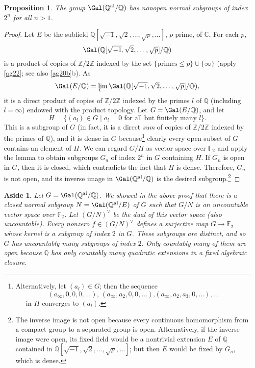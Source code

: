 \documentclass[a4paper,11pt,final,openany]{memoir}
\newtheorem{proposition}[X]{Proposition}
\newtheorem{aside}[X]{Aside}
\theoremstyle{nonumberplain}
\newtheorem{proof}{Proof.}
\begin{document}
\begin{proposition}
\label{ig17}The group $\Gal(\mathbb{Q}^{\mathrm{al}}/\mathbb{Q}{})$ has
nonopen normal subgroups of index $2^{n}$ for all $n>1$.
\end{proposition}

\begin{proof}
Let $E$ be the subfield $\mathbb{Q}{}[\sqrt{-1},\sqrt{2},\ldots,\sqrt
{p},\ldots]$, $p$ prime, of $\mathbb{C}$. For each $p$,
\[
\Gal(\mathbb{Q}[\sqrt{-1},\sqrt{2},\ldots,\sqrt{p}]/\mathbb{Q})
\]
is a product of copies of $\mathbb{Z}/2\mathbb{Z}$ indexed by the set
$\{\mathrm{primes}\leq p\}\cup\{\infty\}$ (apply \ref{ag22}; see also
\ref{ag20b}b). As
\[
\Gal(E/\mathbb{Q}{})=\varprojlim\Gal(\mathbb{Q}{}[\sqrt{-1},\sqrt{2}%
,\ldots,\sqrt{p}]/\mathbb{Q}{}),
\]
it is a direct product of copies of $\mathbb{Z}/2\mathbb{Z}$ indexed by the
primes $l$ of $\mathbb{Q}{}$ (including $l=\infty$) endowed with the product
topology. Let $G=\Gal(E/\mathbb{Q}{})$, and let
\[
H=\{(a_{l})\in G\mid a_{l}=0\text{ for all but finitely many }l\}.
\]
This is a subgroup of $G$ (in fact, it is a direct \textit{sum} of copies of
$\mathbb{Z}/2\mathbb{Z}$ indexed by the primes of $\mathbb{Q}{}$), and it is
dense in $G$ because\footnote{Alternatively, let $(a_{l})\in G$; then the
sequence
\[
(a_{\infty},0,0,0,\ldots)\text{, }(a_{\infty},a_{2},0,0,\ldots)\text{,
}(a_{\infty},a_{2},a_{3},0,\ldots),\ldots
\]
$\quad$\ in $H$ converges to $(a_{l})$.} clearly every open subset of $G$
contains an element of $H$. We can regard $G/H$ as vector space over
$\mathbb{F}{}_{2}$ and apply the lemma to obtain subgroups $G_{n}$ of index
$2^{n}$ in $G$ containing $H$. If $G_{n}$ is open in $G$, then it is closed,
which contradicts the fact that $H$ is dense. Therefore, $G_{n}$ is not open,
and its inverse image in $\Gal(\mathbb{Q}{}^{\mathrm{al}}/\mathbb{Q}{})$ is
the desired subgroup.\footnote{The inverse image is not open because every
continuous homomorphism from a compact group to a separated group is open.
Alternatively, if the inverse image were open, its fixed field would be a
nontrivial extension $E$ of $\mathbb{Q}$ contained in $\mathbb{Q}{}[\sqrt
{-1},\sqrt{2},\ldots,\sqrt{p},\ldots]$; but then $E$ would be fixed by $G_{n}%
$, which is dense.}
\end{proof}

\begin{aside}
\label{ig19}Let $G=\Gal(\mathbb{Q}^{\mathrm{al}}/\mathbb{Q}{})$. We showed in
the above proof that there is a closed normal subgroup $N=\Gal(\mathbb{Q}%
{}^{\mathrm{al}}/E{})$ of $G$ such that $G/N$ is an uncountable vector space
over $\mathbb{F}{}_{2}$. Let $(G/N)^{\vee}$ be the dual of this vector space
(also uncountable). Every nonzero $f\in(G/N)^{\vee}$ defines a surjective map
$G\rightarrow\mathbb{F}{}_{2}$ whose kernel is a subgroup of index $2$ in $G$.
These subgroups are distinct, and so $G$ has uncountably many subgroups of
index $2$. Only countably many of them are open because $\mathbb{Q}{}$ has
only countably many quadratic extensions in a fixed algebraic closure.
\end{aside}
\end{document}
